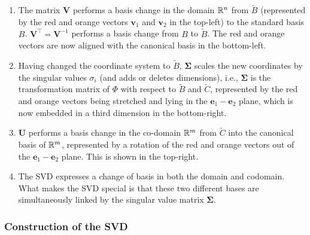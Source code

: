 \begin{enumerate}
    \item The matrix $\bm{V}$ performs a basis change in the domain $\mathbb{R}^n$ from $\tilde{B}$ (represented by the red and orange vectors $\bm{v}_1$ and $\bm{v}_2$ in the top-left) to the standard basis $B$. 
    $\bm{V}^\top = \bm{V}^{-1}$ performs a basis change from $B$ to $\tilde{B}$. 
    The red and orange vectors are now aligned with the canonical basis in the bottom-left.
    \hfill \cite{mfml/book/mml/Deisenroth-Faisal-Ong}

    \item Having changed the coordinate system to $\tilde{B}$, $\bm{\Sigma}$ scales the new coordinates by the singular values $\sigma _i$ (and adds or deletes dimensions), i.e., $\bm{\Sigma}$  is the transformation matrix of $\Phi$ with respect to $\tilde{B}$ and $\tilde{C}$, represented by the red and orange vectors being stretched and lying in the $\bm{e}_1-\bm{e}_2$ plane, which is now embedded in a third dimension in the bottom-right.
    \hfill \cite{mfml/book/mml/Deisenroth-Faisal-Ong}

    \item $\bm{U}$ performs a basis change in the co-domain $\mathbb{R}^m$ from $\tilde{C}$ into the canonical basis of $\mathbb{R}^m$, represented by a rotation of the red and orange vectors out of the $\bm{e}_1-\bm{e}_2$ plane. 
    This is shown in the top-right.
    \hfill \cite{mfml/book/mml/Deisenroth-Faisal-Ong}

    \item The SVD expresses a change of basis in both the domain and codomain.
    What makes the SVD special is that these two different bases are simultaneously linked by the singular value matrix $\bm{\Sigma}$.
    \hfill \cite{mfml/book/mml/Deisenroth-Faisal-Ong}
\end{enumerate}



\subsubsection{Construction of the SVD}

